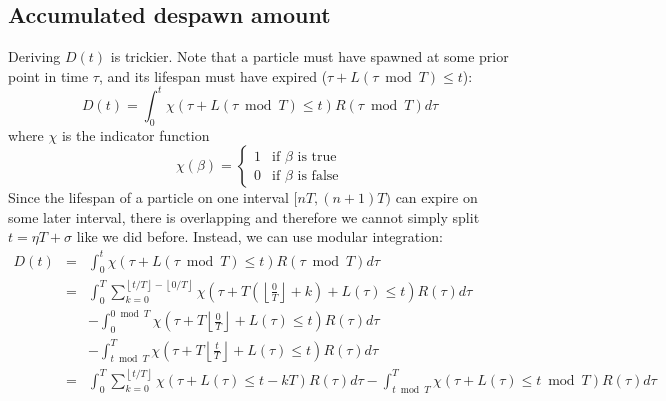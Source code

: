 \documentclass[10pt]{report}
\newcommand{\floor}[1]{\left\lfloor #1 \right\rfloor}
\begin{document}
\subsection{Accumulated despawn amount}
Deriving $D(t)$ is trickier. Note that a particle must have spawned at some prior point in time $\tau$, and its lifespan must have expired ($\tau+L(\tau\bmod T)\leq t$):
\begin{equation}D(t)=\int_0^t\chi(\tau+L(\tau\bmod T)\leq t)R(\tau\bmod T)d\tau\end{equation}
where $\chi$ is the indicator function
\begin{equation}\chi(\beta)=\begin{cases}1&\mbox{if }\beta\mbox{ is true}\\0&\mbox{if }\beta\mbox{ is false}\end{cases}\end{equation}
Since the lifespan of a particle on one interval $[nT,(n+1)T)$ can expire on some later interval, there is overlapping and therefore we cannot simply split $t=\eta T+\sigma$ like we did before. Instead, we can use modular integration:
\begin{eqnarray}
D(t)&=&\int_0^t\chi(\tau+L(\tau\bmod T)\leq t)R(\tau\bmod T)d\tau\\
&=&\int_0^T\sum_{k=0}^{\floor{t/T}-\floor{0/T}}\chi(\tau+T(\floor{\tfrac{0}{T}}+k)+L(\tau)\leq t)R(\tau)d\tau\nonumber\\&&-\int_0^{0\bmod T}\chi(\tau+T\floor{\tfrac{0}{T}}+L(\tau)\leq t)R(\tau)d\tau\nonumber\\&&-\int_{t\bmod T}^T\chi(\tau+T\floor{\tfrac{t}{T}}+L(\tau)\leq t)R(\tau)d\tau\\
&=&\int_0^T\sum_{k=0}^{\floor{t/T}}\chi(\tau+L(\tau)\leq t-kT)R(\tau)d\tau-\int_{t\bmod T}^T\chi(\tau+L(\tau)\leq t\bmod T)R(\tau)d\tau
\end{eqnarray}
\end{document}
